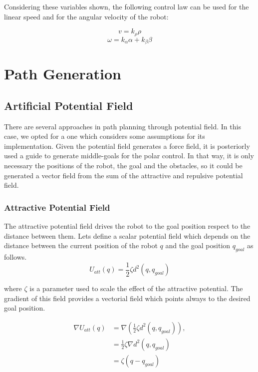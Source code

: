 \documentclass[conference]{IEEEtran}
\begin{document}
Considering these variables shown, the following control law can be used for the linear speed and for the angular velocity of the robot:

\begin{equation}
	v = k_{\rho}\rho
\end{equation}
\begin{equation}
	\omega = k_{\alpha}\alpha + k_{\beta}\beta
\end{equation}


\section{Path Generation}
\label{sec:APF}
\subsection{Artificial Potential Field}
There are several approaches in path planning through potential field. In this case, we opted for a one which considers some assumptions for its implementation. Given the potential field generates a force field, it is posteriorly used a guide to generate middle-goals for the polar control. In that way, it is only necessary the positions of the robot, the goal and the obstacles, so it could be generated a vector field from the sum of the attractive  and repulsive potential field.\\

\subsubsection{\textbf{Attractive Potential Field}}
The attractive potential field drives the robot to the goal position respect to the distance between them. Lets define a scalar potential field which depends on the distance between the current position of the robot $q$ and the goal position $q_{goal}$ as follows. 
\begin{equation}
	U_{att}(q) = \frac{1}{2} \zeta d^2(q,q_{goal})
	\label{eq:pot_attr}
\end{equation}

where  $\zeta$  is a parameter used to scale the effect of the attractive potential. The gradient of this field provides a vectorial field which points always to the desired goal position.

\begin{equation}
	\label{gradient_att}
	\begin{aligned}
		\nabla U_{att}(q) &= \nabla (\frac{1}{2}\zeta d^2 (q,q_{goal})),\\
		&=\frac{1}{2}\zeta \nabla d^2(q,q_{goal})\\
		&= \zeta(q - q_{goal})
	\end{aligned}
\end{equation}
\end{document}
